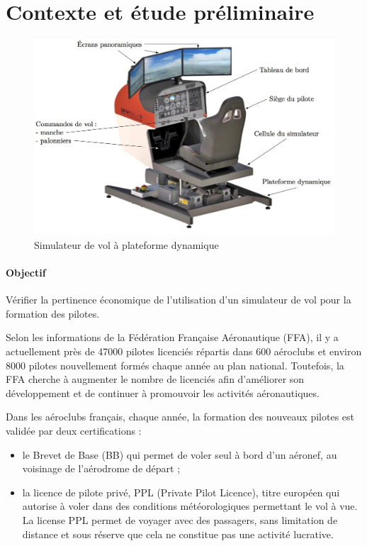 

\section{Contexte et étude préliminaire}

\begin{figure}[!h]
 \centering\includegraphics[width=0.7\linewidth]{img/figure_1}
 \caption{Simulateur de vol à plateforme dynamique}
 \label{img01}
\end{figure}

\paragraph{Objectif}

Vérifier la pertinence économique de l'utilisation d'un simulateur de vol pour la formation des pilotes. 

Selon les informations de la Fédération Française Aéronautique (FFA), il y a actuellement près de 47000 pilotes licenciés répartis dans 600 aéroclubs et environ 8000 pilotes nouvellement formés chaque année au plan national. Toutefois, la FFA cherche à augmenter le nombre de licenciés afin d'améliorer son développement et de continuer à promouvoir les activités aéronautiques.

Dans les aéroclubs français, chaque année, la formation des nouveaux pilotes est validée par deux certifications :\begin{itemize}
 \item le Brevet de Base (BB) qui permet de voler seul à bord d'un aéronef, au voisinage de l'aérodrome de départ ;
 \item la licence de pilote privé, PPL (Private Pilot Licence), titre européen qui autorise à voler dans des conditions météorologiques permettant le vol à vue. La license PPL permet de voyager avec des passagers, sans limitation de distance et sous réserve que cela ne constitue pas une activité lucrative.
\end{itemize}

